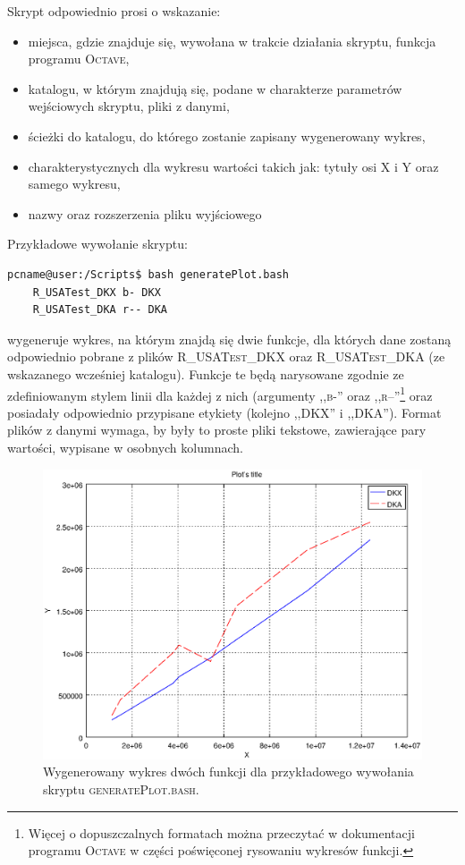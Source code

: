 Skrypt odpowiednio prosi o wskazanie:

\begin{itemize}
\item miejsca, gdzie znajduje się, wywołana w trakcie działania skryptu, funkcja programu \textsc{Octave},
\item katalogu, w którym znajdują się, podane w charakterze parametrów wejściowych skryptu, pliki z danymi,
\item ścieżki do katalogu, do którego zostanie zapisany wygenerowany wykres,
\item charakterystycznych dla wykresu wartości takich jak: tytuły osi X i Y oraz samego wykresu,
\item nazwy oraz rozszerzenia pliku wyjściowego
\end{itemize}

Przykładowe wywołanie skryptu:

\begin{lstlisting}[language=bash]
pcname@user:/Scripts$ bash generatePlot.bash
	R_USATest_DKX b- DKX 
	R_USATest_DKA r-- DKA
\end{lstlisting}

wygeneruje wykres, na którym znajdą się dwie funkcje, dla których dane zostaną odpowiednio pobrane z plików \textsc{R\_USATest\_DKX} oraz \textsc{R\_USATest\_DKA} (ze wskazanego wcześniej katalogu). Funkcje te będą narysowane zgodnie ze zdefiniowanym stylem linii dla każdej z nich (argumenty ,,\textsc{b-}'' oraz ,,\textsc{r--}''\footnote{Więcej o dopuszczalnych formatach można przeczytać w dokumentacji programu \textsc{Octave} w części poświęconej rysowaniu wykresów funkcji.} oraz posiadały odpowiednio przypisane etykiety (kolejno ,,\textsc{DKX}'' i ,,\textsc{DKA}''). Format plików z danymi wymaga, by były to proste pliki tekstowe, zawierające pary wartości, wypisane w osobnych kolumnach.

\begin{figure}[!htbp]
	\centering
	\includegraphics[width=\textwidth]{Appendix_I/GENERATE-PLOT-bash/a.eps}
	\caption{Wygenerowany wykres dwóch funkcji dla przykładowego wywołania skryptu \textsc{generatePlot.bash}.}
\end{figure}

